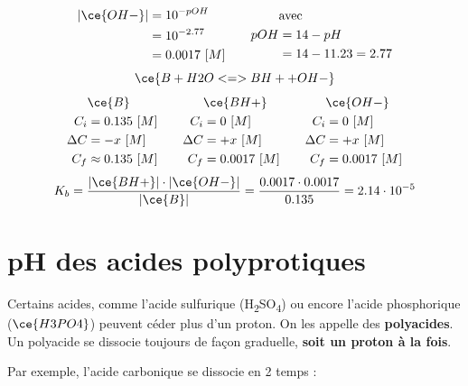 \documentclass[
  11pt,
  french,
  a4paper,
  openany]{book}
\begin{document}
\begin{Answer}
\[
\begin{split}
|\ce{OH-}| &= 10^{-pOH} \\
 &= 10^{-2.77} \\
 &= 0.0017\ [M]
\end{split}
\qquad
\begin{split}
&\text{avec} \\
pOH &= 14 - pH \\
  &= 14 - 11.23 = 2.77
\end{split}
\]
\[
\ce{B + H2O <=> BH+ + OH-}
\]
\[
\begin{split}
&\ce{B}\\
C_i &= 0.135\ [M] \\
\Delta C &= - x\ [M] \\
C_f &\approx 0.135\ [M] \\
\end{split}
\qquad
\begin{split}
&\ce{BH+}\\
C_i &= 0\ [M] \\
\Delta C &= + x\ [M] \\
C_f &= 0.0017\ [M] \\
\end{split}
\qquad
\begin{split}
&\ce{OH-}\\
C_i &= 0\ [M] \\
\Delta C &= + x\ [M] \\
C_f &= 0.0017\ [M] \\
\end{split}
\]
\[
K_b = \frac{|\ce{BH+}| \cdot |\ce{OH-}|}{|\ce{B}|} = \frac{0.0017 \cdot 0.0017}{0.135} = 2.14 \cdot 10^{-5}
\]

\end{Answer}

\clearpage

\hypertarget{ph-des-acides-polyprotiques}{%
\section{pH des acides polyprotiques}\label{ph-des-acides-polyprotiques}}

Certains acides, comme l'acide sulfurique (H\textsubscript{2}SO\textsubscript{4}) ou encore l'acide phosphorique (\(\ce{H3PO4}\)) peuvent céder plus d'un proton. On les appelle des \textbf{polyacides}. Un polyacide se dissocie toujours de façon graduelle, \textbf{soit un proton à la fois}.

Par exemple, l'acide carbonique se dissocie en 2 temps :
\end{document}
